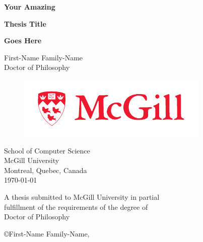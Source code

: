


\begin{titlepage}
\begin{center}

\vspace*{0.5cm}


{\bfseries\LARGE  Your Amazing}
\vspace{0.15cm}

{\bfseries\LARGE  Thesis Title}
\vspace{0.15cm}

{\bfseries\LARGE  Goes Here}
\vspace{1.8cm}

{\large First-Name Family-Name}
\\Doctor of Philosophy

\vspace{1cm}
\begin{figure}[ht!]
    \centering
    \includegraphics[width=.6\linewidth]{images/mcgill_sig_red.pdf}
  \end{figure}
School of Computer Science\\
McGill University\\
Montreal, Quebec, Canada\\

\vspace{1.5cm}
\today


\vspace{1.0cm}
\noindent
A thesis submitted to McGill University in partial\\
fulfillment of the requirements of the degree of\\
Doctor of Philosophy

\vspace{1.0cm}
{\small \copyright First-Name Family-Name, \the\year{}}


\end{center}
\end{titlepage}





